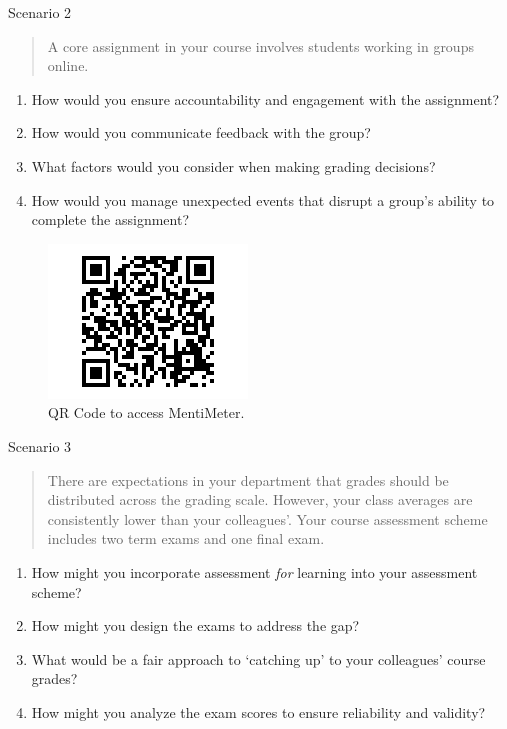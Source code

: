 \documentclass[
]{book}
\providecommand{\tightlist}{%
  \setlength{\itemsep}{0pt}\setlength{\parskip}{0pt}}
\begin{document}
Scenario 2

\begin{quote}
A core assignment in your course involves students working in groups online.
\end{quote}

\begin{enumerate}
\def\labelenumi{\arabic{enumi}.}
\tightlist
\item
  How would you ensure accountability and engagement with the assignment?
\item
  How would you communicate feedback with the group?
\item
  What factors would you consider when making grading decisions?
\item
  How would you manage unexpected events that disrupt a group's ability to complete the assignment?
\end{enumerate}

\begin{figure}
\centering
\includegraphics{assets/twu-asmt/scenario2.png}
\caption{QR Code to access MentiMeter.}
\end{figure}

Scenario 3

\begin{quote}
There are expectations in your department that grades should be distributed across the grading scale. However, your class averages are consistently lower than your colleagues'. Your course assessment scheme includes two term exams and one final exam.
\end{quote}

\begin{enumerate}
\def\labelenumi{\arabic{enumi}.}
\tightlist
\item
  How might you incorporate assessment \emph{for} learning into your assessment scheme?
\item
  How might you design the exams to address the gap?
\item
  What would be a fair approach to `catching up' to your colleagues' course grades?
\item
  How might you analyze the exam scores to ensure reliability and validity?
\end{enumerate}
\end{document}
